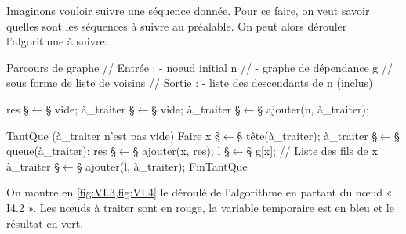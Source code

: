 Imaginons vouloir suivre une séquence donnée. Pour ce faire, on veut savoir quelles sont les séquences à suivre au préalable. On peut alors dérouler l'algorithme à suivre.

\begin{algorithm}{Parcours de graphe}
// Entrée : - noeud initial n
//          - graphe de dépendance g 
//            sous forme de liste de voisins
// Sortie : - liste des descendants de n (inclus)

res §$\leftarrow$§ vide;
à_traiter §$\leftarrow$§ vide;
à_traiter §$\leftarrow$§ ajouter(n, à_traiter);

TantQue (à_traiter n'est pas vide) Faire
  x §$\leftarrow$§ tête(à_traiter);
  à_traiter §$\leftarrow$§ queue(à_traiter);
  res §$\leftarrow$§ ajouter(x, res);
  l §$\leftarrow$§ g[x]; // Liste des fils de x
  à_traiter §$\leftarrow$§ ajouter(l, à_traiter);
FinTantQue
\end{algorithm}

On montre en \cref{fig:VI.3,fig:VI.4} le déroulé de l'algorithme en partant du nœud « I4.2 ». Les nœuds à traiter sont en rouge, la variable temporaire est en bleu et le résultat en vert.

